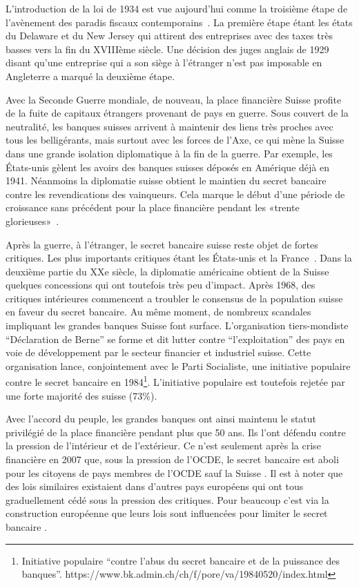 \documentclass[11pt]{article}
\begin{document}
L'introduction de la loi de 1934 est vue aujourd'hui comme la troisième étape de
l'avènement des paradis fiscaux contemporains~\citep[p. 29]{Chavagneux12}. La
première étape étant les états du Delaware et du New Jersey qui attirent des
entreprises avec des taxes très basses vers la fin du XVIIIème siècle. Une
décision des juges anglais de 1929 disant qu'une entreprise qui a son siège à
l'étranger n'est pas imposable en Angleterre a marqué la deuxième étape.


Avec la Seconde Guerre mondiale, de nouveau, la place financière Suisse profite
de la fuite de capitaux étrangers provenant de pays en guerre. Sous couvert de
la neutralité, les banques suisses arrivent à maintenir des liens très proches
avec tous les belligérants, mais surtout avec les forces de l’Axe, ce qui mène
la Suisse dans une grande isolation diplomatique à la fin de la guerre. Par
exemple, les États-unis gèlent les avoirs des banques suisses déposés en
Amérique déjà en 1941. Néanmoins la diplomatie suisse obtient le maintien du
secret bancaire contre les revendications des vainqueurs. Cela marque le début
d’une période de croissance sans précédent pour la place financière pendant les
«trente glorieuses»~\citep[p. 495]{Mazbouri12}.

Après la guerre, à l'étranger, le secret bancaire suisse reste objet de fortes
critiques. Les plus importants critiques étant les États-unis et la
France~\citep[p. 503]{Mazbouri12}. Dans la deuxième partie du XXe siècle, la
diplomatie américaine obtient de la Suisse quelques concessions qui ont
toutefois très peu d'impact. Après 1968, des critiques intérieures commencent a
troubler le consensus de la population suisse en faveur du secret bancaire. Au
même moment, de nombreux scandales impliquant les grandes banques Suisse font
surface. L’organisation tiers-mondiste “Déclaration de Berne” \citep{EvB} se
forme et dit lutter contre ``l'exploitation'' des pays en voie de développement
par le secteur financier et industriel suisse. Cette organisation lance,
conjointement avec le Parti Socialiste, une initiative populaire contre le
secret bancaire en 1984\footnote{Initiative populaire ``contre l'abus du secret
bancaire et de la puissance des banques''.
https://www.bk.admin.ch/ch/f/pore/va/19840520/index.html}. L'initiative
populaire est toutefois rejetée par une forte majorité des suisse (73\%).

Avec l'accord du peuple, les grandes banques ont ainsi maintenu le
statut privilégié de la place financière pendant plus que 50 ans. Ils l’ont
défendu contre la pression de l’intérieur et de l’extérieur. Ce n’est
seulement après la crise financière en 2007 que, sous la pression de l'OCDE,
le secret bancaire est aboli pour les citoyens de pays membres de l'OCDE
sauf la Suisse \citep{NeufVies}.
Il est à noter que des lois similaires existaient dans d'autres pays européens
qui ont tous graduellement cédé sous la pression des critiques. Pour beaucoup
c'est via la construction européenne que leurs lois sont influencées pour
limiter le secret bancaire \citep[p. 32]{Palan09}.
\end{document}
